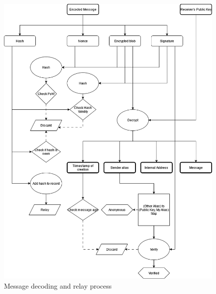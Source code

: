 \documentclass{article}
\begin{document}
\begin{figure}[h]
    \centering
    \includegraphics[width=0.55\linewidth]{decode_nbg.png}
    \caption{Message decoding and relay process}
\end{figure}
\end{document}

